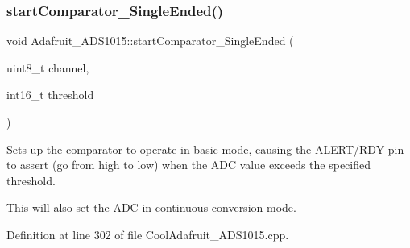 \subsubsection{\texorpdfstring{start\+Comparator\+\_\+\+Single\+Ended()}{startComparator\_SingleEnded()}}
{\footnotesize\ttfamily void Adafruit\+\_\+\+A\+D\+S1015\+::start\+Comparator\+\_\+\+Single\+Ended (\begin{DoxyParamCaption}\item[{uint8\+\_\+t}]{channel,  }\item[{int16\+\_\+t}]{threshold }\end{DoxyParamCaption})}



Sets up the comparator to operate in basic mode, causing the A\+L\+E\+R\+T/\+R\+DY pin to assert (go from high to low) when the A\+DC value exceeds the specified threshold. 

This will also set the A\+DC in continuous conversion mode. 

Definition at line 302 of file Cool\+Adafruit\+\_\+\+A\+D\+S1015.\+cpp.


